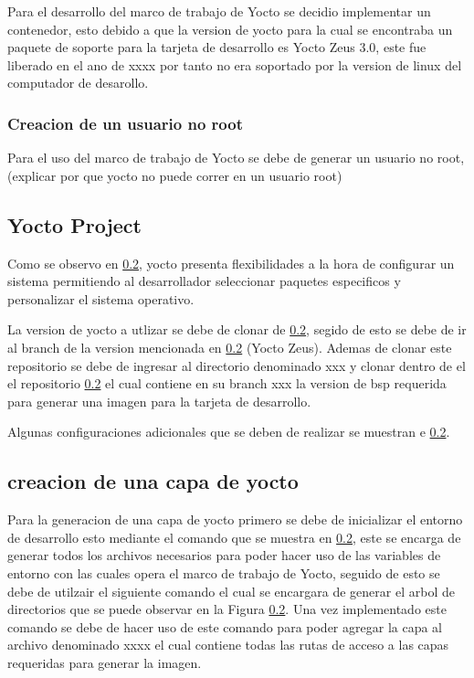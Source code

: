 Para el desarrollo del marco de trabajo de Yocto se decidio implementar un contenedor, esto debido a que la version de yocto para la cual se encontraba un paquete de soporte para la tarjeta de desarrollo es Yocto Zeus 3.0, este fue liberado en el ano de xxxx por tanto no era soportado por la version de linux del computador de desarollo. 

\subsubsection{Creacion de un usuario no root}

Para el uso del marco de trabajo de Yocto se debe de generar un usuario no root, (explicar por que yocto no puede correr en un usuario root)

\subsection{Yocto Project}

Como se observo en \ref{}, yocto presenta flexibilidades a la hora de configurar un sistema permitiendo al desarrollador seleccionar paquetes especificos y personalizar el sistema operativo.

La version de yocto a utlizar se debe de clonar de \ref{}, segido de esto se debe de ir al branch de la version mencionada en \ref{} (Yocto Zeus). Ademas de clonar este repositorio se debe de ingresar al directorio denominado xxx y clonar dentro de el el repositorio \ref{} el cual contiene en su branch xxx la version de bsp requerida para generar una imagen para la tarjeta de desarrollo.


Algunas configuraciones adicionales que se deben de realizar se muestran e \ref{}.

\subsection{creacion de una capa de yocto}

Para la generacion de una capa de yocto primero se debe de inicializar el entorno de desarrollo esto mediante el comando que se muestra en \ref{}, este se encarga de generar todos los archivos necesarios para poder hacer uso de las variables de entorno con las cuales opera el marco de trabajo de Yocto, seguido de esto se debe de utilzair el siguiente comando el cual se encargara de generar el arbol de directorios que se puede observar en la Figura \ref{}. Una vez implementado este comando se debe de hacer uso de este comando para poder agregar la capa al archivo denominado xxxx el cual contiene todas las rutas de acceso a las capas requeridas para generar la imagen.

